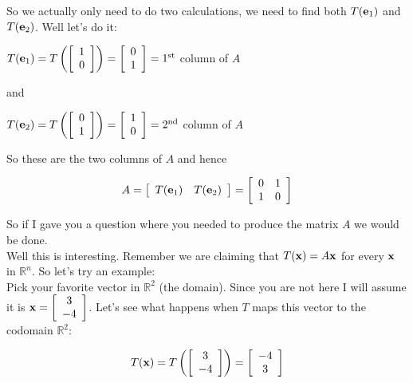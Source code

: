 \documentclass[12pt]{article}
\begin{document}
\noindent So we actually only need to do two calculations, we need to find both $T({\bf e}_1)$ and $T({\bf e}_2)$.  Well let's do it:

$T({\bf e}_1) = T\left(  \left[ \begin{array}{c} 1 \\ 0  \end{array} \right]\right) = \left[ \begin{array}{c} 0 \\ 1  \end{array} \right] = 1^{\text{st}}$ column of $A$

\noindent and

$T({\bf e}_2) = T\left(  \left[ \begin{array}{c} 0 \\ 1  \end{array} \right]\right) = \left[ \begin{array}{c} 1 \\ 0  \end{array} \right] = 2^{\text{nd}}$ column of $A$

So these are the two columns of $A$ and hence 

\[ A = \left[ \begin{array}{cc} T({\bf e}_1) & T({\bf e}_2) \end{array} \right] =\left[ \begin{array}{cc} 0 &1\\1&0  \end{array} \right]  \]

\noindent So if I gave you a question where you needed to produce the matrix $A$ we would be done.\\

\noindent Well this is interesting.  Remember we are claiming that $T({\bf x})=A{\bf x}$ for every ${\bf x}$ in $\mathbb{R}^n$.  So let's try an example:\\

\noindent Pick your favorite vector in $\mathbb{R}^2$ (the domain).  Since you are not here I will assume it is ${\bf x} = \left[ \begin{array}{c} 3 \\ -4  \end{array} \right]$.  Let's see what happens when $T$ maps this vector to the codomain $\mathbb{R}^2$:

\[ T({\bf x}) =T\left(  \left[ \begin{array}{c} 3 \\ -4  \end{array} \right] \right) = \left[ \begin{array}{c} -4 \\ 3  \end{array} \right]\]
\end{document}
